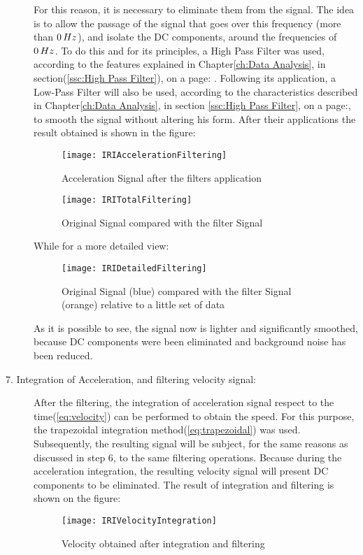\documentclass[tesi]{subfiles}
\begin{document}
\begin{description}
For this reason, it is necessary to eliminate them from the signal. The idea is to allow the passage of the signal that goes over this frequency (more than $0 \thinspace Hz$), and isolate the DC components, around the frequencies of $0 \thinspace Hz$. To do this and for its principles, a High Pass Filter was used, according to the features explained in Chapter\ref{ch:Data Analysis}, in section(\ref{ssc:High Pass Filter}), on a page: \pageref{ssc:High Pass Filter}.
Following its application, a Low-Pass Filter will also be used, according to the characteristics described in Chapter\ref{ch:Data Analysis}, in section \ref{ssc:High Pass Filter}, on a page:\pageref{ssc:Low Pass Filter}, to smooth the signal without altering his form.
After their applications the result obtained is shown in the figure:
\begin{figure}[H]
\centering
\texttt{[image: IRIAccelerationFiltering]}
\caption{Acceleration Signal after the filters application}
\end{figure}

\begin{figure}[H]
\centering
\texttt{[image: IRITotalFiltering]}
\caption{Original Signal compared with the filter Signal}
\end{figure}

While for a more detailed view:
\begin{figure}[H]
\centering
\texttt{[image: IRIDetailedFiltering]}
\caption{Original Signal (blue) compared with the filter Signal (orange) relative to a little set of data}
\end{figure}
As it is possible to see, the signal now is lighter and significantly smoothed, because DC components were been eliminated and background noise has been reduced.
\item[7. Integration of Acceleration, and filtering velocity signal:] After the filtering, the integration of acceleration signal respect to the time(\ref{eq:velocity}) can be performed to obtain the speed. For this purpose, the trapezoidal integration method(\ref{eq:trapezoidal}) was used. Subsequently, the resulting signal will be subject, for the same reasons as discussed in step 6, to the same filtering operations. Because during the acceleration integration, the resulting velocity signal will present DC components to be eliminated.
The result of integration and filtering is shown on the figure:
\begin{figure}[H]
\centering
\texttt{[image: IRIVelocityIntegration]}
\caption{Velocity obtained after integration and filtering}
\end{figure}


\end{description}
\end{document}
